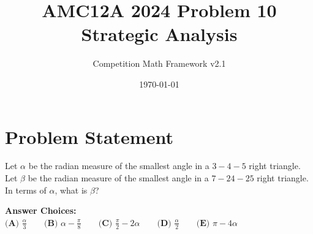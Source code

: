 \documentclass[11pt]{article}
\begin{document}
\title{\textbf{AMC12A 2024 Problem 10\\Strategic Analysis}}
\author{Competition Math Framework v2.1}
\date{\today}
\maketitle

\section*{Problem Statement}

Let $\alpha$ be the radian measure of the smallest angle in a $3{-}4{-}5$ right triangle. Let $\beta$ be the radian measure of the smallest angle in a $7{-}24{-}25$ right triangle. In terms of $\alpha$, what is $\beta$?

\vspace{0.5em}
\textbf{Answer Choices:}\\
$\textbf{(A) }\frac{\alpha}{3}\qquad \textbf{(B) }\alpha - \frac{\pi}{8}\qquad \textbf{(C) }\frac{\pi}{2} - 2\alpha \qquad \textbf{(D) }\frac{\alpha}{2}\qquad \textbf{(E) }\pi - 4\alpha$
\end{document}
